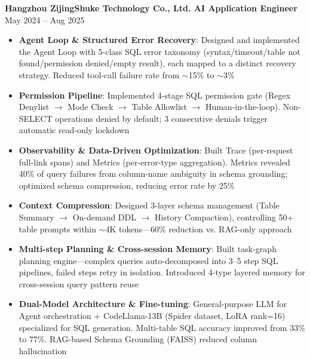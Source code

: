 \documentclass[10pt, a4paper]{article}
\newcommand{\entry}[2]{
  \vspace{0.4em}
  \noindent\textbf{#1} \hfill \small #2
  \vspace{0.15em}\newline
}
\begin{document}
\entry{Hangzhou ZijingShuke Technology Co., Ltd. \textbar{} AI Application Engineer}{May 2024 -- Aug 2025}
\begin{itemize}
  \item \textbf{Agent Loop \& Structured Error Recovery}: Designed and implemented the Agent Loop with 5-class SQL error taxonomy (syntax/timeout/table not found/permission denied/empty result), each mapped to a distinct recovery strategy. Reduced tool-call failure rate from $\sim$15\% to $\sim$3\%

  \item \textbf{Permission Pipeline}: Implemented 4-stage SQL permission gate (Regex Denylist $\to$ Mode Check $\to$ Table Allowlist $\to$ Human-in-the-loop). Non-SELECT operations denied by default; 3 consecutive denials trigger automatic read-only lockdown

  \item \textbf{Observability \& Data-Driven Optimization}: Built Trace (per-request full-link spans) and Metrics (per-error-type aggregation). Metrics revealed 40\% of query failures from column-name ambiguity in schema grounding; optimized schema compression, reducing error rate by 25\%

  \item \textbf{Context Compression}: Designed 3-layer schema management (Table Summary $\to$ On-demand DDL $\to$ History Compaction), controlling 50+ table prompts within $\sim$4K tokens---60\% reduction vs. RAG-only approach

  \item \textbf{Multi-step Planning \& Cross-session Memory}: Built task-graph planning engine---complex queries auto-decomposed into 3--5 step SQL pipelines, failed steps retry in isolation. Introduced 4-type layered memory for cross-session query pattern reuse

  \item \textbf{Dual-Model Architecture \& Fine-tuning}: General-purpose LLM for Agent orchestration + CodeLlama-13B (Spider dataset, LoRA rank=16) specialized for SQL generation. Multi-table SQL accuracy improved from 33\% to 77\%. RAG-based Schema Grounding (FAISS) reduced column hallucination
\end{itemize}
\end{document}
